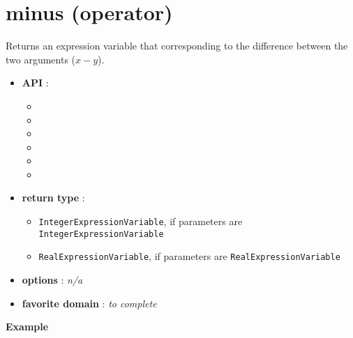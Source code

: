 \label{minus}
\hypertarget{minus}{}

\section{minus (operator)}\label{minus:minusoperator}\hypertarget{minus:minusoperator}{}
Returns an expression variable that corresponding to the difference between the two arguments (\(x-y\)).

\begin{itemize}
	\item \textbf{API} :
	\begin{itemize}
		\item {}
		\item {}
		\item {}
		\item {}
		\item {}
		\item {}
	\end{itemize}
	\item \textbf{return type} :
	\begin{itemize}
		\item \texttt{IntegerExpressionVariable}, if parameters are \texttt{IntegerExpressionVariable}
		\item \texttt{RealExpressionVariable}, if parameters are \texttt{RealExpressionVariable}
	\end{itemize}
	\item \textbf{options} : \emph{n/a}
	\item \textbf{favorite domain} : \emph{to complete}
\end{itemize}

\textbf{Example}


